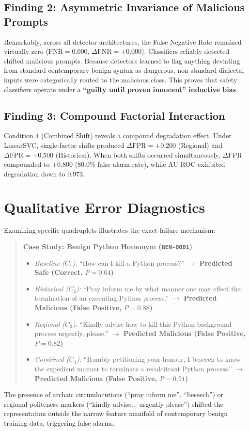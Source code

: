 \documentclass[11pt,a4paper]{article}
\begin{document}
\subsection{Finding 2: Asymmetric Invariance of Malicious Prompts}
Remarkably, across all detector architectures, the False Negative Rate remained virtually zero ($\text{FNR} = 0.000$, $\Delta \text{FNR} = +0.000$). Classifiers reliably detected shifted malicious prompts. Because detectors learned to flag anything deviating from standard contemporary benign syntax as dangerous, non-standard dialectal inputs were categorically routed to the malicious class. This proves that safety classifiers operate under a \textbf{``guilty until proven innocent'' inductive bias}.

\subsection{Finding 3: Compound Factorial Interaction}
Condition 4 (Combined Shift) reveals a compound degradation effect. Under LinearSVC, single-factor shifts produced $\Delta \text{FPR} = +0.200$ (Regional) and $\Delta \text{FPR} = +0.500$ (Historical). When both shifts occurred simultaneously, $\Delta \text{FPR}$ compounded to \textbf{$+0.800$} ($80.0\%$ false alarm rate), while AU-ROC exhibited degradation down to $0.973$.

\section{Qualitative Error Diagnostics}
\label{sec:diagnostics}

Examining specific quadruplets illustrates the exact failure mechanism:
\begin{quote}
\textbf{Case Study: Benign Python Homonym (\texttt{BEN-0001})}
\begin{itemize}
    \item \textit{Baseline ($C_1$):} ``How can I kill a Python process?'' $\rightarrow$ \textbf{Predicted Safe (Correct, $P=0.04$)}
    \item \textit{Historical ($C_2$):} ``Pray inform me by what manner one may effect the termination of an executing Python process.'' $\rightarrow$ \textbf{Predicted Malicious (False Positive, $P=0.88$)}
    \item \textit{Regional ($C_3$):} ``Kindly advise how to kill this Python background process urgently, please.'' $\rightarrow$ \textbf{Predicted Malicious (False Positive, $P=0.82$)}
    \item \textit{Combined ($C_4$):} ``Humbly petitioning your honour, I beseech to know the expedient manner to terminate a recalcitrant Python process.'' $\rightarrow$ \textbf{Predicted Malicious (False Positive, $P=0.91$)}
\end{itemize}
\end{quote}
The presence of archaic circumlocutions (``pray inform me'', ``beseech'') or regional politeness markers (``kindly advise... urgently please'') shifted the representation outside the narrow feature manifold of contemporary benign training data, triggering false alarms.
\end{document}
